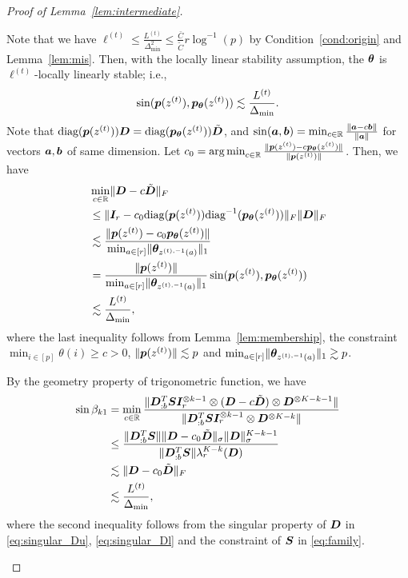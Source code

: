 \documentclass[journal]{IEEEtran}
\theoremstyle{definition}
\theoremstyle{definition}
\begin{document}
\begin{proof}[Proof of Lemma~\ref{lem:intermediate}]
\begin{enumerate}[wide]
    {Note that we have $\ell^{(t)} \leq \frac{L^{(t)}}{\Delta_{\min}^2} \leq \frac{\bar C}{\tilde C} r \log^{-1}(p) $ by Condition~\ref{cond:origin} and Lemma~\ref{lem:mis}. Then,  with the locally linear stability assumption, the $\boldsymbol{\theta}$ is $\ell^{(t)}$-locally linearly stable; i.e.,}
    \begin{equation}
         \sin (\bm{p}(z^{(t)}), \bm{p}_{\boldsymbol{\theta}}(z^{(t)})) \lesssim \frac{L^{(t)}}{\Delta_{\min}}. 
    \end{equation}
    Note that $\text{diag}(\bm{p}(z^{(t)})) \bm{D} = \text{diag}(\bm{p}_{\boldsymbol{\theta}}(z^{(t)})) \tilde {\bm{D}}$, and $\sin(\bm{a},\bm{b}) =\min_{c \in \mathbb{R}} \frac{ \lVert\bm{a} - c\bm{b}\rVert }{\lVert\bm{a}\rVert}$ for vectors $\bm{a},\bm{b}$ of same dimension. Let $c_0 = \operatorname*{arg\,min}_{c \in \mathbb{R}} \frac{\lVert\bm{p}(z^{(t)}) - c\bm{p}_{\boldsymbol{\theta}}(z^{(t)})\rVert}{\lVert\bm{p}(z^{(t)})\rVert}$. Then, we have
    \begin{align}
      &\min_{c \in \mathbb{R}} \lVert \bm{D} - c \tilde {\bm{D}}\rVert_F \\
      &\leq  \lVert \bm I_r - c_0 \text{diag}(\bm{p}(z^{(t)})) \text{diag}^{-1}(\bm{p}_{\boldsymbol{\theta}}(z^{(t)}))\rVert_F \lVert\bm{D}\rVert_F\\
      &\lesssim \frac{ \lVert \bm{p}(z^{(t)}) - c_0\bm{p}_{\boldsymbol{\theta}}(z^{(t)})\rVert }{\min_{a \in [r]} \lVert\boldsymbol{\theta}_{z^{(t),-1}(a)} \rVert_1  } \\
      & = \frac{\lVert \bm{p}(z^{(t)})\rVert }{\min_{a \in [r]} \lVert\boldsymbol{\theta}_{z^{(t),-1}(a)} \rVert_1 } \sin (\bm{p}(z^{(t)}), \bm{p}_{\boldsymbol{\theta}}(z^{(t)}))\\
      & \lesssim \frac{L^{(t)}}{\Delta_{\min}},
    \end{align}
    where the last inequality follows from Lemma~\ref{lem:membership}, the constraint $\min_{i \in [p]}\theta(i) \geq c>0$, $\lVert \bm{p}(z^{(t)})\rVert \lesssim p$ and $\min_{a \in [r]} \lVert\boldsymbol{\theta}_{z^{(t),-1}(a)} \rVert_1  \gtrsim p$. 
    
    By the geometry property of trigonometric function, we have
    \begin{align}
        \sin \beta_{k1} &= \min_{c \in \bbR} \frac{\onormSize{}{\mD_{:b}^{T} \mS \mI_r^{\otimes k-1} \otimes (\mD - c \tilde \mD) \otimes \mD^{\otimes K-k - 1} } }{ \onormSize{}{\mD_{:b}^{T} \mS \mI_r^{\otimes k-1} \otimes \mD^{\otimes K-k}} }\\
        &\leq \frac{ \onormSize{}{\mD_{:b}^{T} \mS} \onormSize{}{\mD - c_0 \tilde \mD}_{\sigma} \onormSize{}{\mD}_{\sigma}^{K-k-1} }{\onormSize{}{\mD_{:b}^{T} \mS} \lambda_r^{K-k}(\mD) }\\
        & \lesssim  \onormSize{}{\mD - c_0 \tilde \mD}_{F}\\
        & \lesssim \frac{L^{(t)}}{\Delta_{\min}}, \label{eq:b1}
    \end{align}
    where the second inequality follows from the singular property of $\bm{D}$ in \eqref{eq:singular_Du}, \eqref{eq:singular_Dl} and the constraint of $\bm S$ in \eqref{eq:family}.
    

\end{enumerate}
\end{proof}
\end{document}
